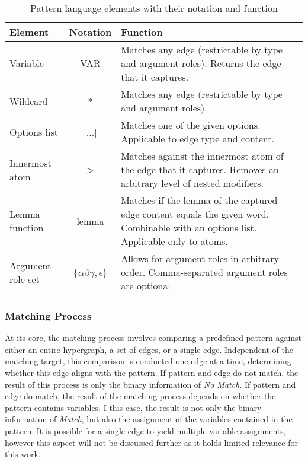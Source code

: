 \documentclass[11pt, numbers=noenddot]{scrreprt}
\begin{document}
\begin{table}[h]
\centering
\begin{tabular}{lcp{9cm}}
\toprule
\textbf{Element} & \textbf{Notation} & \textbf{Function} \\
\midrule
Variable & \textsf{VAR} & Matches any edge (restrictable by type and argument roles). Returns the edge that it captures. \\
Wildcard & \textsf{*} & Matches any edge (restrictable by type and argument roles). \\
Options list & \textsf{[...]} & Matches one of the given options. Applicable to edge type and content. \\
Innermost atom & \textsf{>} & Matches against the innermost atom of the edge that it captures. Removes an arbitrary level of nested modifiers. \\
Lemma function & \textsf{lemma} & Matches if the lemma of the captured edge content equals the given word. Combinable with an options list. Applicable only to atoms. \\
Argument role set & \textsf{\{\(\alpha\beta\gamma, \epsilon\)\}} & Allows for argument roles in arbitrary order. Comma-separated argument roles are optional \\
\bottomrule
\end{tabular}
\caption{Pattern language elements with their notation and function}
\label{tab:pattern-language-elements}
\end{table}

\subsubsection{Matching Process}
\label{sec:pattern-matching-process}
At its core, the matching process involves comparing a predefined pattern against either an entire hypergraph, a set of edges, or a single edge. Independent of the matching target, this comparison is conducted one edge at a time, determining whether this edge aligns with the pattern. If pattern and edge do not match, the result of this process is only the binary information of \textit{No Match}. If pattern and edge do match, the result of the matching process depends on whether the pattern contains variables. I this case, the result is not only the binary information of \textit{Match}, but also the assignment of the variables contained in the pattern. It is possible for a single edge to yield multiple variable assignments, however this aspect will not be discussed further as it holds limited relevance for this work. 
\end{document}
